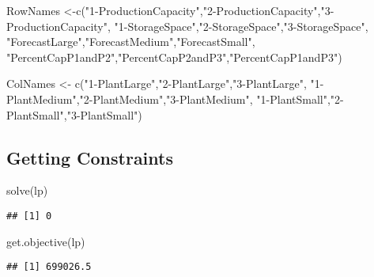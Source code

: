 \documentclass[
]{article}
\newenvironment{Shaded}{\begin{snugshade}}{\end{snugshade}}
\newcommand{\FunctionTok}[1]{\textcolor[rgb]{0.00,0.00,0.00}{#1}}
\newcommand{\NormalTok}[1]{#1}
\newcommand{\OtherTok}[1]{\textcolor[rgb]{0.56,0.35,0.01}{#1}}
\newcommand{\StringTok}[1]{\textcolor[rgb]{0.31,0.60,0.02}{#1}}
\begin{document}
\begin{Shaded}
\begin{Highlighting}[]
\NormalTok{RowNames }\OtherTok{\textless{}{-}}\FunctionTok{c}\NormalTok{(}\StringTok{"1{-}ProductionCapacity"}\NormalTok{,}\StringTok{"2{-}ProductionCapacity"}\NormalTok{,}\StringTok{"3{-}ProductionCapacity"}\NormalTok{,}
             \StringTok{"1{-}StorageSpace"}\NormalTok{,}\StringTok{"2{-}StorageSpace"}\NormalTok{,}\StringTok{"3{-}StorageSpace"}\NormalTok{,}
             \StringTok{"ForecastLarge"}\NormalTok{,}\StringTok{"ForecastMedium"}\NormalTok{,}\StringTok{"ForecastSmall"}\NormalTok{,}
             \StringTok{"PercentCapP1andP2"}\NormalTok{,}\StringTok{"PercentCapP2andP3"}\NormalTok{,}\StringTok{"PercentCapP1andP3"}\NormalTok{)}

\NormalTok{ColNames }\OtherTok{\textless{}{-}} \FunctionTok{c}\NormalTok{(}\StringTok{"1{-}PlantLarge"}\NormalTok{,}\StringTok{"2{-}PlantLarge"}\NormalTok{,}\StringTok{"3{-}PlantLarge"}\NormalTok{,}
              \StringTok{"1{-}PlantMedium"}\NormalTok{,}\StringTok{"2{-}PlantMedium"}\NormalTok{,}\StringTok{"3{-}PlantMedium"}\NormalTok{,}
              \StringTok{"1{-}PlantSmall"}\NormalTok{,}\StringTok{"2{-}PlantSmall"}\NormalTok{,}\StringTok{"3{-}PlantSmall"}\NormalTok{)}
\end{Highlighting}
\end{Shaded}

\hypertarget{getting-constraints}{%
\subsection{Getting Constraints}\label{getting-constraints}}

\begin{Shaded}
\begin{Highlighting}[]
\FunctionTok{solve}\NormalTok{(lp)}
\end{Highlighting}
\end{Shaded}

\begin{verbatim}
## [1] 0
\end{verbatim}

\begin{Shaded}
\begin{Highlighting}[]
\FunctionTok{get.objective}\NormalTok{(lp)}
\end{Highlighting}
\end{Shaded}

\begin{verbatim}
## [1] 699026.5
\end{verbatim}
\end{document}
